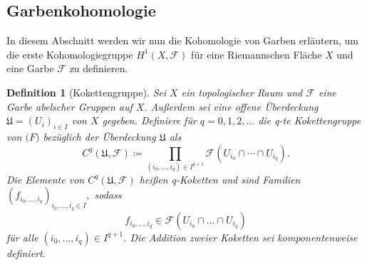 \documentclass[11pt,a4paper,toc=bibliography]{scrartcl}
\theoremstyle{thm}
\theoremstyle{def}
\newtheorem{defi}{Definition}[section]
\theoremstyle{remark}
\begin{document}
\subsection{Garbenkohomologie}
In diesem Abschnitt werden wir nun die Kohomologie von Garben erläutern, um die erste Kohomologiegruppe $H^1(X,\mathcal{F})$ für eine Riemannschen Fläche $X$ und eine Garbe $\mathcal{F}$ zu definieren.
\begin{defi}[Kokettengruppe]
Sei $X$ ein topologischer Raum und $\mathcal{F}$ eine Garbe abelscher Gruppen auf $X$. Außerdem sei eine offene Überdeckung $\mathfrak{U}= (U_i)_{i\in I}$ von $X$ gegeben.
Definiere für $q =0,1,2,...$ die \emph{q-te Kokettengruppe} von $\mathcal(F)$ bezüglich der Überdeckung $\mathfrak{U}$ als 
\[
C^q(\mathfrak{U},\mathcal{F}) \coloneqq \prod_{(i_0,...,i_q)\in I^{q+1}} \mathcal{F}(U_{i_0}\cap \cdots\cap U_{i_q}). 
\]
Die Elemente von $C^q(\mathfrak{U},\mathcal{F})$ heißen \emph{q-Koketten} und sind Familien
$
(f_{i_0,...,i_q})_{i_0,...,i_q\in I}, 
$
sodass
\[
 f_{i_0,...,i_q}\in\mathcal{F}(U_{i_0}\cap \ldots \cap U_{i_q})
\]
für alle $(i_0,\ldots,i_q)\in I^{q+1}$.
Die Addition zweier Koketten sei komponentenweise definiert.
\end{defi}
\end{document}
